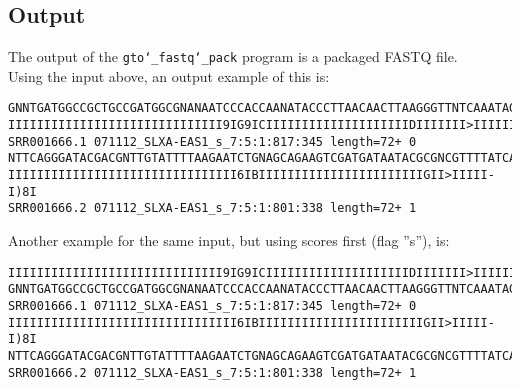 \subsection*{Output}
The output of the \texttt{gto\char`_fastq\char`_pack} program is a packaged FASTQ file.\\
Using the input above, an output example of this is:
\begin{lstlisting}
GNNTGATGGCCGCTGCCGATGGCGNANAATCCCACCAANATACCCTTAACAACTTAAGGGTTNTCAAATAGA
IIIIIIIIIIIIIIIIIIIIIIIIIIIIII9IG9ICIIIIIIIIIIIIIIIIIIIIDIIIIIII>IIIIII/
SRR001666.1 071112_SLXA-EAS1_s_7:5:1:817:345 length=72+	0
NTTCAGGGATACGACGNTTGTATTTTAAGAATCTGNAGCAGAAGTCGATGATAATACGCGNCGTTTTATCAN
IIIIIIIIIIIIIIIIIIIIIIIIIIIIIIII6IBIIIIIIIIIIIIIIIIIIIIIIIGII>IIIII-I)8I
SRR001666.2 071112_SLXA-EAS1_s_7:5:1:801:338 length=72+	1
\end{lstlisting}
Another example for the same input, but using scores first (flag ''s''), is:
\begin{lstlisting}
IIIIIIIIIIIIIIIIIIIIIIIIIIIIII9IG9ICIIIIIIIIIIIIIIIIIIIIDIIIIIII>IIIIII/
GNNTGATGGCCGCTGCCGATGGCGNANAATCCCACCAANATACCCTTAACAACTTAAGGGTTNTCAAATAGA
SRR001666.1 071112_SLXA-EAS1_s_7:5:1:817:345 length=72+	0
IIIIIIIIIIIIIIIIIIIIIIIIIIIIIIII6IBIIIIIIIIIIIIIIIIIIIIIIIGII>IIIII-I)8I
NTTCAGGGATACGACGNTTGTATTTTAAGAATCTGNAGCAGAAGTCGATGATAATACGCGNCGTTTTATCAN
SRR001666.2 071112_SLXA-EAS1_s_7:5:1:801:338 length=72+	1
\end{lstlisting}
